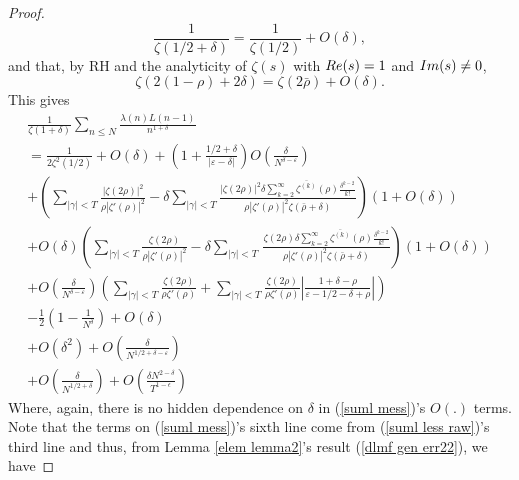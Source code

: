 \documentclass[11pt,article]{amsart}
\numberwithin{equation}{section}
\numberwithin{equation}{section}
\numberwithin{lemma}{section}
\numberwithin{prop}{section}
\begin{document}
\begin{proof}
\begin{equation}
\frac{1}{\zeta(1/2+\delta)}=\frac{1}{\zeta(1/2)}+O(\delta),
\end{equation}
and that, by RH and the analyticity of $\zeta(s)$ with $\textnormal{Re}(s)=1$ and $\textnormal{Im}(s)\neq 0$,
\begin{equation}
\zeta\left(2(1-\rho)+2\delta \right)=\zeta\left(2\bar{\rho}\right)+O(\delta).  \label{zetadubrho}
\end{equation}
This gives
\begin{align}
\frac{1}{\zeta(1+\delta)}\sum_{n\leq N}\frac{\lambda(n)L(n-1)}{n^{1+\delta}} \nonumber \\ =\frac{1}{2\zeta^{2}(1/2)}+O\left(\delta\right)+\left(1+\frac{1/2+\delta}{\left|\varepsilon-\delta\right|}\right)O\left(\frac{\delta}{N^{\delta-\varepsilon}}\right) \nonumber \\ 
+\left(\sum_{\left|\gamma\right|<T}\frac{\left|\zeta(2\rho)\right|^{2}}{\rho\left|\zeta'(\rho)\right|^{2}}-\delta\sum_{\left|\gamma\right|<T}\frac{\left|\zeta(2\rho)\right|^{2}\delta\sum_{k=2}^{\infty}\overline{\zeta^{(k)}}(\rho)\frac{\delta^{k-2}}{k!}}{\rho\left|\zeta'(\rho)\right|^{2}\zeta\left(\bar{\rho}+\delta\right)}\right)\left(1+O(\delta)\right) \nonumber\\ 
+O(\delta)\left(\sum_{\left|\gamma\right|<T}\frac{\zeta(2\rho)}{\rho\left|\zeta'(\rho)\right|^{2}}-\delta\sum_{\left|\gamma\right|<T}\frac{}{}\frac{\zeta(2\rho)\delta\sum_{k=2}^{\infty}\overline{\zeta^{(k)}}(\rho)\frac{\delta^{k-2}}{k!}}{\rho\left|\zeta'(\rho)\right|^{2}\zeta\left(\bar{\rho}+\delta\right)}\right)\left(1+O(\delta)\right)
\nonumber \\
+O\left(\frac{\delta}{N^{\delta-\varepsilon}}\right)\left(\sum_{\left|\gamma\right|<T}\frac{\zeta(2\rho)}{\rho\zeta'(\rho)}+\sum_{\left|\gamma\right|<T}\frac{\zeta(2\rho)}{\rho\zeta'(\rho)}\left|\frac{1+\delta-\rho}{\varepsilon-1/2-\delta+\rho}\right|\right)
\nonumber\\ 
-\frac{1}{2}\left(1-\frac{1}{N^{\delta}}\right)+O(\delta)\nonumber\\
+O\left(\delta^{2}\right)+O\left(\frac{\delta}{N^{1/2+\delta-\varepsilon}}\right) \nonumber \\
+O\left(\frac{\delta}{N^{1/2+\delta}}\right)+O\left(\frac{\delta N^{2-\delta}}{T^{1-\epsilon}}\right) \label{suml mess}
\end{align}
Where, again, there is no hidden dependence on $\delta$ in (\ref{suml mess})'s $O(.)$ terms. Note that the terms on (\ref{suml mess})'s sixth line come from (\ref{suml less raw})'s third line and thus, from Lemma \ref{elem lemma2}'s result (\ref{dlmf gen err22}), we have

\end{proof}
\end{document}
